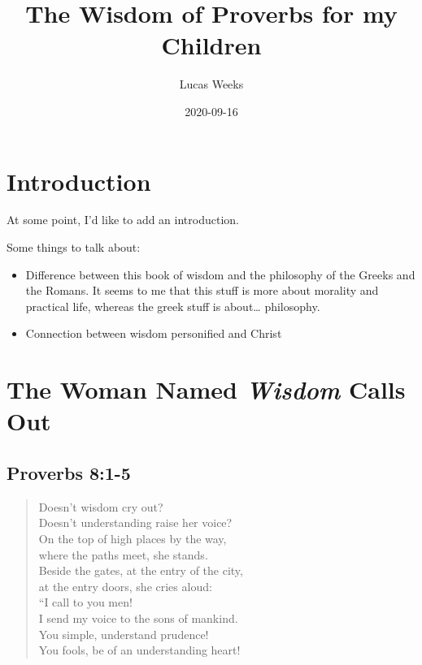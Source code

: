 \documentclass[
]{book}
\title{The Wisdom of Proverbs for my Children}
\author{Lucas Weeks}
\date{2020-09-16}
\providecommand{\tightlist}{%
  \setlength{\itemsep}{0pt}\setlength{\parskip}{0pt}}
\begin{document}
\maketitle

{
\setcounter{tocdepth}{1}
\tableofcontents
}
\hypertarget{introduction}{%
\chapter{Introduction}\label{introduction}}

At some point, I'd like to add an introduction.

Some things to talk about:

\begin{itemize}
\tightlist
\item
  Difference between this book of wisdom and the philosophy of the Greeks and the Romans. It seems to me that this stuff is more about morality and practical life, whereas the greek stuff is about\ldots{} philosophy.
\item
  Connection between wisdom personified and Christ
\end{itemize}

\hypertarget{the-woman-named-wisdom-calls-out}{%
\chapter{\texorpdfstring{The Woman Named \emph{Wisdom} Calls Out}{The Woman Named Wisdom Calls Out}}\label{the-woman-named-wisdom-calls-out}}

\hypertarget{proverbs-81-5}{%
\section{Proverbs 8:1-5}\label{proverbs-81-5}}

\begin{quote}
Doesn't wisdom cry out?\\
Doesn't understanding raise her voice?\\
On the top of high places by the way,\\
where the paths meet, she stands.\\
Beside the gates, at the entry of the city,\\
at the entry doors, she cries aloud:\\
``I call to you men!\\
I send my voice to the sons of mankind.\\
You simple, understand prudence!\\
You fools, be of an understanding heart!
\end{quote}
\end{document}
